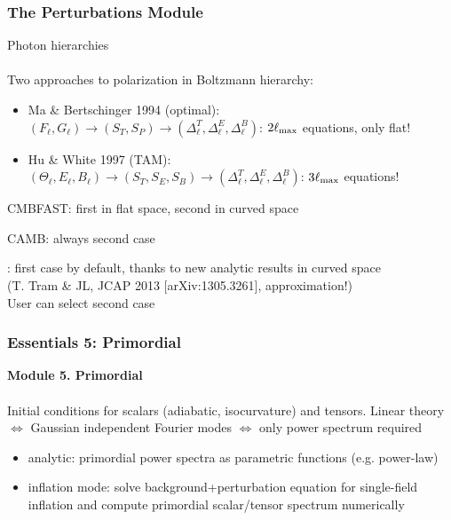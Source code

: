 \begin{frame}[fragile]
\frametitle{The Perturbations Module}

Photon hierarchies\\
\mbox{}\\
Two approaches to polarization in Boltzmann hierarchy:
\begin{itemize}
	\item Ma \& Bertschinger 1994 (optimal):\\$(F_\ell, G_\ell) \rightarrow (S_T, S_P)  \rightarrow (\Delta_\ell^T, \Delta_\ell^E, \Delta_\ell^B)$: $2 \ell_{\rm max}$ equations, only flat!
	\item Hu \& White 1997 (TAM):\\$(\Theta_\ell, E_\ell, B_\ell) \rightarrow (S_T, S_E, S_B)  \rightarrow (\Delta_\ell^T, \Delta_\ell^E, \Delta_\ell^B)$: $3 \ell_{\rm max}$ equations!
\end{itemize}

\pause
\vspace{0.2cm}

{\Red CMBFAST}: first in flat space, second in curved space\\

\pause
\vspace{0.2cm}

{\Red CAMB}: always second case\\

\pause
\vspace{0.2cm}

{\Red \CLASS{}}: first case by default, thanks to new analytic results in curved space\\ \hfill (T. Tram \& JL, JCAP 2013 [arXiv:1305.3261], approximation!) \\
User can select second case


\end{frame}



\begin{frame}[fragile]
\frametitle{Essentials 5: Primordial}

{\bf Module 5. Primordial}\\
\mbox{}\\
Initial conditions for scalars (adiabatic, isocurvature) and tensors. 
Linear theory $\Leftrightarrow$ Gaussian independent Fourier modes $\Leftrightarrow$ only power spectrum required
\begin{itemize}
\item analytic: primordial power spectra as parametric functions (e.g. power-law)
\item inflation mode: solve background+perturbation equation for single-field inflation and compute primordial scalar/tensor spectrum numerically
\end{itemize}
\mbox{ }\\

\end{frame}


